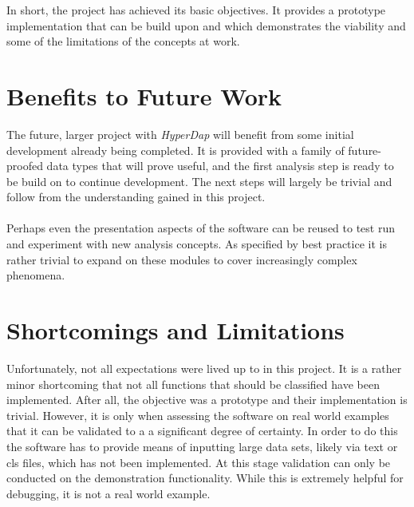 \documentclass[main.tex]{subfiles}
\begin{document}
  
  In short, the project has achieved its basic objectives. It provides a prototype implementation that can be build upon and which demonstrates the viability and some of the limitations of the concepts at work.  
  
  \section{Benefits to Future Work}
    
    The future, larger project with \textit{HyperDap} will benefit from some initial development already being completed. It is provided with a family of future-proofed data types that will prove useful, and the first analysis step is ready to be build on to continue development. The next steps will largely be trivial and follow from the understanding gained in this project. 
    \\\\
    Perhaps even the presentation aspects of the software can be reused to test run and experiment with new analysis concepts. As specified by best practice it is rather trivial to expand on these modules to cover increasingly complex phenomena. 
    
  \section{Shortcomings and Limitations}
    
    Unfortunately, not all expectations were lived up to in this project. It is a rather minor shortcoming that not all functions that should be classified have been implemented. After all, the objective was a prototype and their implementation is trivial. However, it is only when assessing the software on real world examples that it can be validated to a a significant degree of certainty. In order to do this the software has to provide means of inputting large data sets, likely via text or cls files, which has not been implemented. At this stage validation can only be conducted on the demonstration functionality. While this is extremely helpful for debugging, it is not a real world example.
    
\end{document}
